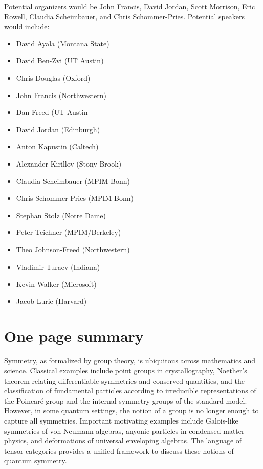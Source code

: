 \documentclass[12pt]{article}
\begin{document}
Potential organizers would be John Francis, David Jordan, Scott Morrison, Eric Rowell, Claudia Scheimbauer, and Chris Schommer-Pries.
Potential speakers would include:
\begin{multicols}{2}
\begin{itemize}
  \setlength{\itemsep}{1pt}
  \setlength{\parskip}{0pt}
  \setlength{\parsep}{0pt}
\item David Ayala	(Montana State)
\item David Ben-Zvi (UT Austin)
\item Chris Douglas	(Oxford)
\item John Francis (Northwestern)
\item Dan Freed	(UT Austin
\item David Jordan (Edinburgh)
\item Anton Kapustin	(Caltech)
\item Alexander Kirillov	(Stony Brook)
\item Claudia Scheimbauer	(MPIM Bonn)
\item Chris Schommer-Pries	(MPIM Bonn)
\item Stephan Stolz	(Notre Dame)
\item Peter Teichner	(MPIM/Berkeley)
\item Theo Johnson-Freed	(Northwestern)
\item Vladimir Turaev	(Indiana)
\item Kevin Walker (Microsoft)
\item Jacob Lurie (Harvard)
\end{itemize}
\end{multicols}

\section{One page summary}
Symmetry, as formalized by group theory, is ubiquitous across mathematics and science. Classical examples include point groups in crystallography, Noether's theorem relating differentiable symmetries and conserved quantities, and the classification of fundamental particles according to irreducible representations of the Poincar\'e group and the internal symmetry groups of the standard model. However, in some quantum settings, the notion of a group is no longer enough to capture all symmetries.  Important motivating examples include Galois-like symmetries of von Neumann algebras, anyonic particles in condensed matter physics, and deformations of universal enveloping algebras. The language of tensor categories provides a unified framework to discuss these notions of quantum symmetry.
\end{document}
